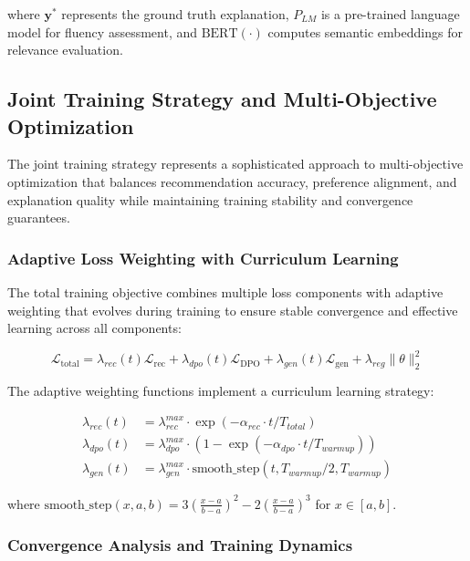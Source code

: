 \documentclass[pdflatex,sn-mathphys-num]{sn-jnl}%
\theoremstyle{thmstyleone}%
\theoremstyle{thmstyletwo}%
\theoremstyle{thmstylethree}%
\begin{document}
where $\mathbf{y}^*$ represents the ground truth explanation, $P_{LM}$ is a pre-trained language model for fluency assessment, and $\text{BERT}(\cdot)$ \cite{devlin2018bert} computes semantic embeddings for relevance evaluation.

\subsection{Joint Training Strategy and Multi-Objective Optimization}\label{subsec:training}

The joint training strategy represents a sophisticated approach to multi-objective optimization that balances recommendation accuracy, preference alignment, and explanation quality while maintaining training stability and convergence guarantees.

\subsubsection{Adaptive Loss Weighting with Curriculum Learning}

The total training objective combines multiple loss components with adaptive weighting that evolves during training to ensure stable convergence and effective learning across all components:

\begin{equation}
\mathcal{L}_{\text{total}} = \lambda_{rec}(t) \mathcal{L}_{\text{rec}} + \lambda_{dpo}(t) \mathcal{L}_{\text{DPO}} + \lambda_{gen}(t) \mathcal{L}_{\text{gen}} + \lambda_{reg} \|\theta\|_2^2
\end{equation}

The adaptive weighting functions implement a curriculum learning strategy:

\begin{align}
\lambda_{rec}(t) &= \lambda_{rec}^{max} \cdot \exp(-\alpha_{rec} \cdot t/T_{total}) \\
\lambda_{dpo}(t) &= \lambda_{dpo}^{max} \cdot (1 - \exp(-\alpha_{dpo} \cdot t/T_{warmup})) \\
\lambda_{gen}(t) &= \lambda_{gen}^{max} \cdot \text{smooth\_step}(t, T_{warmup}/2, T_{warmup})
\end{align}

where $\text{smooth\_step}(x, a, b) = 3(\frac{x-a}{b-a})^2 - 2(\frac{x-a}{b-a})^3$ for $x \in [a,b]$.

\subsubsection{Convergence Analysis and Training Dynamics}
\end{document}
